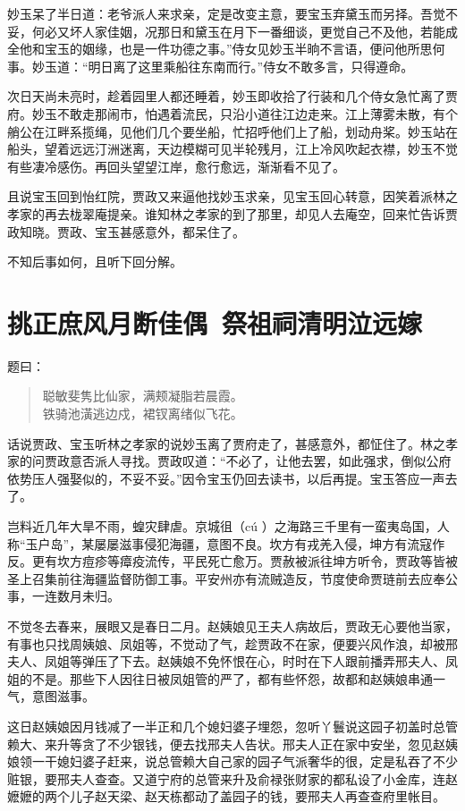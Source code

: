\documentclass[12pt,oneside]{book}
\newenvironment{shici}{%
\begin{verse}%
\centering\large\hspace{12pt}}%
{\end{verse}}
\begin{document}
妙玉呆了半日道：老爷派人来求亲，定是改变主意，要宝玉弃黛玉而另择。吾觉不妥，何必又坏人家佳姻，况那日和黛玉在月下一番细谈，更觉自己不及他，若能成全他和宝玉的姻缘，也是一件功德之事。”侍女见妙玉半晌不言语，便问他所思何事。妙玉道：“明日离了这里乘船往东南而行。”侍女不敢多言，只得遵命。

次日天尚未亮时，趁着园里人都还睡着，妙玉即收拾了行装和几个侍女急忙离了贾府。妙玉不敢走那闹市，怕遇着流民，只沿小道往江边走来。江上薄雾未散，有个艄公在江畔系揽绳，见他们几个要坐船，忙招呼他们上了船，划动舟桨。妙玉站在船头，望着远远汀洲迷离，天边模糊可见半轮残月，江上冷风吹起衣襟，妙玉不觉有些凄冷感伤。再回头望望江岸，愈行愈远，渐渐看不见了。

且说宝玉回到怡红院，贾政又来逼他找妙玉求亲，见宝玉回心转意，因笑着派林之孝家的再去栊翠庵提亲。谁知林之孝家的到了那里，却见人去庵空，回来忙告诉贾政知晓。贾政、宝玉甚感意外，都呆住了。

不知后事如何，且听下回分解。


\chapter{挑正庶风月断佳偶~祭祖祠清明泣远嫁}

题曰： 
\begin{shici}
聪敏斐隽比仙家，满颊凝脂若晨霞。\\
铁骑池潢逃边戍，裙钗离绪似飞花。
\end{shici}


话说贾政、宝玉听林之孝家的说妙玉离了贾府走了，甚感意外，都怔住了。林之孝家的问贾政意否派人寻找。贾政叹道：“不必了，让他去罢，如此强求，倒似公府依势压人强娶似的，不妥不妥。”因令宝玉仍回去读书，以后再提。宝玉答应一声去了。

岂料近几年大旱不雨，蝗灾肆虐。京城徂（cú ）之海路三千里有一蛮夷岛国，人称“玉户岛”，某屡屡滋事侵犯海疆，意图不良。坎方有戎羌入侵，坤方有流寇作反。更有坎方痘疹等瘴疫流传，平民死亡愈万。贾赦被派往坤方听令，贾政等皆被圣上召集前往海疆监督防御工事。平安州亦有流贼造反，节度使命贾琏前去应奉公事，一连数月未归。

不觉冬去春来，展眼又是春日二月。赵姨娘见王夫人病故后，贾政无心要他当家，有事也只找周姨娘、凤姐等，不觉动了气，趁贾政不在家，便要兴风作浪，却被邢夫人、凤姐等弹压了下去。赵姨娘不免怀恨在心，时时在下人跟前播弄邢夫人、凤姐的不是。那些下人因往日被凤姐管的严了，都有些怀怨，故都和赵姨娘串通一气，意图滋事。

这日赵姨娘因月钱减了一半正和几个媳妇婆子埋怨，忽听丫鬟说这园子初盖时总管赖大、来升等贪了不少银钱，便去找邢夫人告状。邢夫人正在家中安坐，忽见赵姨娘领一干媳妇婆子赶来，说总管赖大自己家的园子气派奢华的很，定是私吞了不少赃银，要邢夫人查查。又道宁府的总管来升及俞禄张财家的都私设了小金库，连赵嬷嬷的两个儿子赵天梁、赵天栋都动了盖园子的钱，要邢夫人再查查府里帐目。
\end{document}
